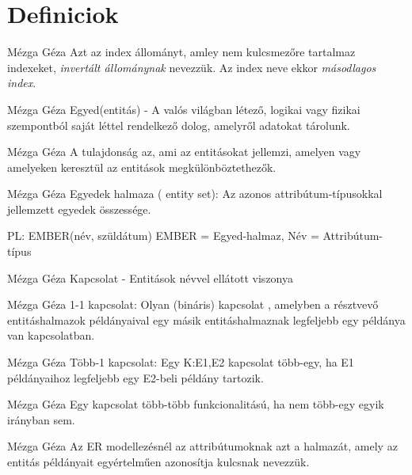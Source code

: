 \section{Definiciok}

\begin{definicio}{Mézga Géza}
Azt az index állományt, amley nem kulcsmezőre tartalmaz indexeket, \textit{invertált állománynak} nevezzük. Az index neve ekkor \textit{másodlagos index}.
\end{definicio}

\begin{definicio}{Mézga Géza}
Egyed(entitás) - A valós világban létező, logikai vagy fizikai szempontból saját léttel rendelkező dolog, amelyről adatokat tárolunk.
\end{definicio}

\begin{definicio}{Mézga Géza}
A tulajdonság az, ami az entitásokat jellemzi, amelyen vagy amelyeken keresztül az entitások megkülönböztethezők.
\end{definicio}

\begin{definicio}{Mézga Géza}
Egyedek halmaza ( entity set): Az azonos attribútum-típusokkal jellemzett egyedek összessége.

PL: EMBER(név, szüldátum) EMBER = Egyed-halmaz, Név = Attribútum-típus
\end{definicio}

\begin{definicio}{Mézga Géza}
Kapcsolat - Entitások névvel ellátott viszonya
\end{definicio}

\begin{definicio}{Mézga Géza}
1-1 kapcsolat: Olyan (bináris) kapcsolat , amelyben a résztvevő entitáshalmazok példányaival egy másik entitáshalmaznak legfeljebb egy példánya van kapcsolatban.
\end{definicio}

\begin{definicio}{Mézga Géza}
Több-1 kapcsolat: Egy K:E1,E2 kapcsolat több-egy, ha E1 példányaihoz legfeljebb egy E2-beli példány tartozik.
\end{definicio}

\begin{definicio}{Mézga Géza}
Egy kapcsolat több-több funkcionalitású, ha nem több-egy egyik irányban sem.
\end{definicio}

\begin{definicio}{Mézga Géza}
Az ER modellezésnél az attribútumoknak azt a halmazát, amely az entitás példányait egyértelműen azonosítja kulcsnak nevezzük.
\end{definicio}

